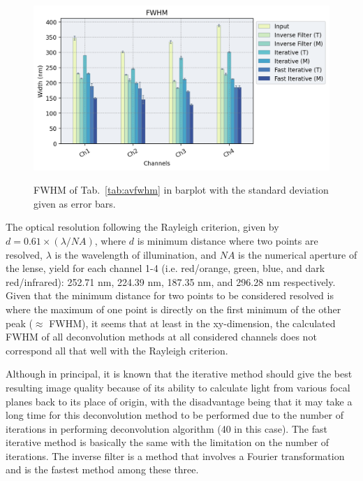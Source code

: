 \begin{figure}[h!]
\centering
\includegraphics[width=.8\columnwidth]{Exp_7_Deconvolution/Figures/av_tabnmerr7}\\
\caption{FWHM of Tab.~\ref{tab:avfwhm} in barplot with the standard deviation given as error bars.}
\label{fig:avfwhmbar}
\end{figure}

The optical resolution following the Rayleigh criterion, given by $d=0.61\times(\lambda/NA)$, where $d$ is minimum distance where two points are resolved, $\lambda$ is the wavelength of illumination, and $NA$ is the numerical aperture of the lense, yield for each channel 1-4 (i.e. red/orange, green, blue, and dark red/infrared): 252.71 nm, 224.39 nm, 187.35 nm, and 296.28 nm respectively. 
Given that the minimum distance for two points to be considered resolved is where the maximum of one point is directly on the first minimum of the other peak ($\approx$ FWHM), it seems that at least in the xy-dimension, the calculated FWHM of all deconvolution methods at all considered channels does not correspond all that well with the Rayleigh criterion.
 
Although in principal, it is known that the iterative method should give the best resulting image quality because of its ability to calculate light from various focal planes back to its place of origin, with the disadvantage being that it may take a long time for this deconvolution method to be performed due to the number of iterations in performing deconvolution algorithm (40 in this case). 
The fast iterative method is basically the same with the limitation on the number of iterations. 
The inverse filter is a method that involves a Fourier transformation and is the fastest method among these three.


